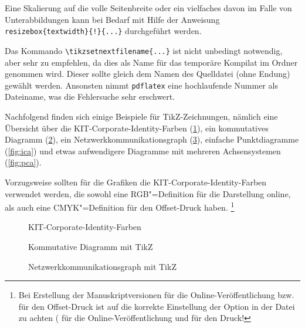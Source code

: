 Eine Skalierung auf die volle Seitenbreite oder ein vielfaches davon im Falle von Unterabbildungen kann bei Bedarf mit Hilfe der Anweisung
\texttt{\bs resizebox\{\bs textwidth\}\{!\}\{...\}}
durchgeführt werden.

Das Kommando \verb+\tikzsetnextfilename{...}+ ist nicht unbedingt notwendig,
 aber sehr zu empfehlen, da dies als Name für das temporäre Kompilat im Ordner
 genommen wird.
Dieser sollte gleich dem Namen des Quelldatei (ohne Endung) gewählt werden.
Ansonsten nimmt \texttt{pdflatex} eine hochlaufende Nummer als Dateiname,
was die Fehlersuche sehr erschwert.

Nachfolgend finden sich einige Beispiele für TikZ-Zeichnungen, nämlich
eine Übersicht über die KIT-Corporate-Identity-Farben (\cref{fig:kit-colors}),
ein kommutatives Diagramm (\cref{fig:kpca}),
ein Netzwerkkommunikationsgraph (\cref{fig:net-comm}),
einfache Punktdiagramme (\cref{fig:ica})
und etwas aufwendigere Diagramme mit mehreren
Achsensystemen (\cref{fig:pca}).

Vorzugsweise sollten für die Grafiken die KIT-Corporate-Identity-Farben verwendet werden,
die sowohl eine RGB"=Definition für die Darstellung online,
als auch eine CMYK"=Definition für den Offset-Druck haben.%
\footnote{Bei Erstellung der Manuskriptversionen
für die Online-Veröffentlichung bzw. für den Offset-Druck
ist auf die korrekte Einstellung der Option 
in der Datei  zu achten
( für die Online-Veröffentlichung und  für den Druck!}

\begin{figure}[hp]%
	\centering%
	\caption{KIT-Corporate-Identity-Farben}%
  \label{fig:kit-colors}%
\end{figure}

\begin{figure}[hp]%
	\centering%
	\caption{Kommutative Diagramm mit TikZ}%
  \label{fig:kpca}%
\end{figure}

\begin{figure}[hp]%
	\centering
	\resizebox{\textwidth}{!}{%
	}%
	\caption{Netzwerkkommunikationsgraph mit TikZ}%
  \label{fig:net-comm}%
\end{figure}

